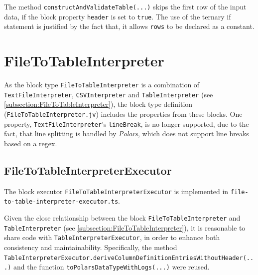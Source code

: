 The method \Verb|constructAndValidateTable(...)| skips the first row of the input data, if the block property \Verb|header| is set to \Verb|true|.
The use of the ternary if statement is justified by the fact that, it allows \Verb|rows| to be declared as a constant.


\section{FileToTableInterpreter}
As the block type \Verb|FileToTableInterpreter| is a combination of \Verb|TextFileInterpreter|, \Verb|CSVInterpreter| and \Verb|TableInterpreter| (see \autoref{subsection:FileToTableInterpreter}), the block type definition (\Verb|FileToTableInterpreter.jv|) includes the properties from these blocks.
One property, \Verb|TextFileInterpreter|'s \Verb|lineBreak|, is no longer supported, due to the fact, that line splitting is handled by \emph{Polars}, which does not support line breaks based on a \ac{regex}.

\subsection{FileToTableInterpreterExecutor}
The block executor \Verb|FileToTableInterpreterExecutor| is implemented in \Verb|file-to-table-interpreter-executor.ts|.

Given the close relationship between the block \Verb|FileToTableInterpreter| and \Verb|TableInterpreter| (see \autoref{subsection:FileToTableInterpreter}), it is reasonable to share code with \Verb|TableInterpreterExecutor|, in order to enhance both consistency and maintainability.
Specifically, the method \Verb|TableInterpreterExecutor.deriveColumnDefinitionEntriesWithoutHeader(...)| and the function \Verb|toPolarsDataTypeWithLogs(...)| were reused.

